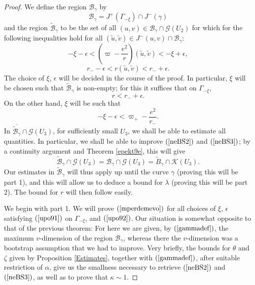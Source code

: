 \documentclass{article}
\begin{document}
{\begin{proof}
We define the region $\mathcal{B}_\gamma$ by
\[
\mathcal{B}_\gamma=J^+(\Gamma_{-\xi})
\cap J^-(\gamma)
\]
and the region $\tilde{\mathcal{B}}_\gamma$ to be
the set of all $(u,v)\in \mathcal{B}_\gamma\cap\mathcal{G}(U_2)$ for which
for the following inequalities hold for all
$(\tilde{u},\tilde{v})\in J^-(u,v)\cap \mathcal{B}_\gamma$:
\begin{equation}
\label{neBS2}
-\xi-\epsilon<\left(\varpi-\frac{e^2}r\right)(\tilde{u},\tilde{v})<-\xi+\epsilon,
\end{equation}
\begin{equation}
\label{neBS3}
r_--\epsilon<r(\tilde{u},\tilde{v})<r_-+\epsilon.
\end{equation}
The choice of $\xi$, $\epsilon$ will be decided
in the course of the proof. In particular, $\xi$ will be chosen
such that $\tilde{\mathcal{B}}_\gamma$ is non-empty; for this it suffices
that 
on $\Gamma_{-\xi}$,
\begin{equation}
\label{upo91}
r<r_-+\epsilon.
\end{equation}
On the other hand, $\xi$ will be such that 
\begin{equation}
\label{upo92}
-\xi-\epsilon<\varpi_+-\frac{e^2}{r_-}.
\end{equation}
In $\overline{\tilde{\mathcal{B}}_\gamma}\cap\mathcal{G}(U_3)$, 
for sufficiently small $U_3$,
we shall be able to estimate all quantities.
In particular, we shall be able to improve $(\ref{neBS2})$
and $(\ref{neBS3})$; by a continuity argument and
Theorem \ref{epekt9e}, this will give
\begin{equation}
\label{mperdemevo}
\tilde{\mathcal{B}}_\gamma\cap\mathcal{G}(U_3)=
\mathcal{B}_\gamma\cap\mathcal{G}(U_3)=
\tilde{B}_\gamma\cap\mathcal{K}(U_3).
\end{equation}
Our estimates in $\tilde{\mathcal{B}}_\gamma$ will thus apply up until the
curve $\gamma$ (proving this will be part 1), 
and this will allow us to deduce a bound for
$\lambda$ (proving this will be part 2).
The bound for $r$ will then follow easily.


We begin with part 1. We will prove $(\ref{mperdemevo})$ for
all choices of $\xi$, $\epsilon$ satisfying $(\ref{upo91})$
on $\Gamma_{-\xi}$,
and $(\ref{upo92})$.
Our situation is somewhat opposite to that
of the previous theorem: For here we are given, by $(\ref{gammadef})$,
the maximum $v$-dimension of
the region $\mathcal{B}_\gamma$, whereas there the $v$-dimension was a bootstrap
assumption that we had to improve. Very briefly, the bounds
for $\theta$ and $\zeta$ given by Proposition \ref{Estimates},
together with $(\ref{gammadef})$,
after suitable restriction of $\alpha$, give
us the smallness necessary to retrieve $(\ref{neBS2})$ and
$(\ref{neBS3})$, as well as to prove that $\kappa\sim1$.


\end{proof}}
\end{document}
